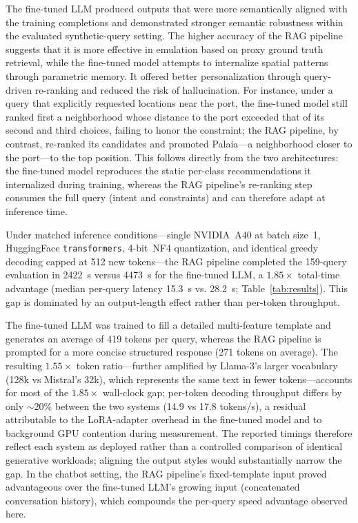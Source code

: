 \documentclass[pdflatex,sn-mathphys-num]{sn-jnl}%
\theoremstyle{thmstyleone}%
\theoremstyle{thmstyletwo}%
\theoremstyle{thmstylethree}%
\begin{document}
The fine-tuned LLM produced outputs that were more semantically aligned with the training completions and demonstrated stronger semantic robustness within the evaluated synthetic-query setting. 
The higher accuracy of the RAG pipeline suggests that it is more effective in emulation based on proxy ground truth retrieval, while the fine-tuned model attempts to internalize spatial patterns through parametric memory. 
It offered better personalization through query-driven re-ranking and reduced the risk of hallucination. For instance, under a query that explicitly requested locations near the port, the fine-tuned model still ranked first a neighborhood whose distance to the port exceeded that of its second and third choices, failing to honor the constraint; the RAG pipeline, by contrast, re-ranked its candidates and promoted Palaia---a neighborhood closer to the port---to the top position. This follows directly from the two architectures: the fine-tuned model reproduces the static per-class recommendations it internalized during training, whereas the RAG pipeline's re-ranking step consumes the full query (intent and constraints) and can therefore adapt at inference time. 

Under matched inference conditions---single NVIDIA~A40 at batch size~1, HuggingFace \texttt{transformers}, 4-bit~NF4 quantization, and identical greedy decoding capped at 512 new tokens---the RAG pipeline completed the 159-query evaluation in 2422~s versus 4473~s for the fine-tuned LLM, a $1.85\times$ total-time advantage (median per-query latency 15.3~s vs. 28.2~s; Table~\ref{tab:results}). This gap is dominated by an output-length effect rather than per-token throughput. 

The fine-tuned LLM was trained to fill a detailed multi-feature template and generates an average of 419 tokens per query, whereas the RAG pipeline is prompted for a more concise structured response (271 tokens on average). The resulting $1.55\times$ token ratio---further amplified by Llama-3's larger vocabulary (128k vs Mistral's 32k), which represents the same text in fewer tokens---accounts for most of the $1.85\times$ wall-clock gap; per-token decoding throughput differs by only $\sim$20\% between the two systems (14.9 vs 17.8 tokens/s), a residual attributable to the LoRA-adapter overhead in the fine-tuned model and to background GPU contention during measurement. The reported timings therefore reflect each system as deployed rather than a controlled comparison of identical generative workloads; aligning the output styles would substantially narrow the gap. In the chatbot setting, the RAG pipeline's fixed-template input proved advantageous over the fine-tuned LLM's growing input (concatenated conversation history), which compounds the per-query speed advantage observed here.
\end{document}
